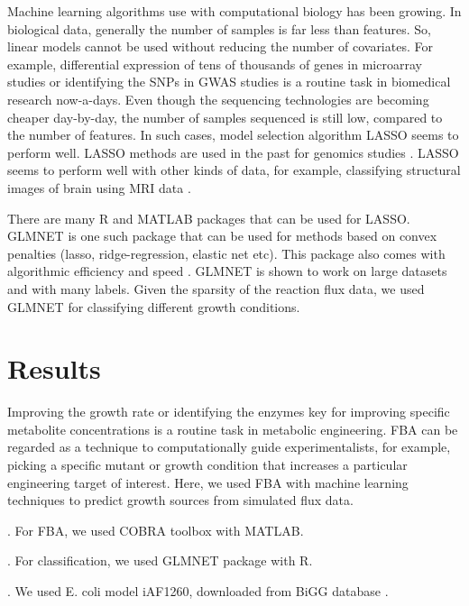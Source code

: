 \documentclass[12pt]{article}
\begin{document}
\bigskip
\noindent
Machine learning algorithms use with computational biology has been growing. In biological data, generally the number of samples is far less than features. So, linear models cannot be used without reducing the number of covariates.  For example, differential expression of tens of thousands of genes in microarray studies or identifying the SNPs in GWAS studies is a routine task in biomedical research now-a-days. Even though the sequencing technologies are becoming cheaper day-by-day, the number of samples sequenced is still low, compared to the number of features. In such cases, model selection algorithm LASSO \cite{Tibshirani1996} seems to perform well. LASSO methods are used in the past for genomics studies \cite{Wuetal2009}. LASSO seems to perform well with other kinds of data, for example, classifying structural images of brain using MRI data \cite{Casanovaetal2011,Casanovaetal2012,Wangetal2012}.

\bigskip
\noindent
There are many R and MATLAB packages that can be used for LASSO. GLMNET  \cite{Friedmanetal2010} is one such package that can be used for methods based on convex penalties (lasso, ridge-regression, elastic net etc). This package also comes with algorithmic efficiency and speed \cite{Friedmanetal2010}. GLMNET is shown to work on large datasets and with many labels. Given the sparsity of the reaction flux data, we used GLMNET \cite{Friedmanetal2010} for classifying different growth conditions.

\section*{Results}

Improving the growth rate or identifying the enzymes key for improving specific metabolite concentrations is a routine task in metabolic engineering. FBA can be regarded as a technique to computationally guide experimentalists, for example, picking a specific mutant or growth condition that increases a particular engineering target of interest. Here, we used FBA with machine learning techniques to predict growth sources from simulated flux data.

\bigskip
{}. For FBA, we used COBRA toolbox \cite{Schellenbergeretal2011} with MATLAB.

\bigskip
{}. For classification, we used GLMNET \cite{Friedmanetal2010} package with R.

\bigskip
{}. We used E. coli model iAF1260, downloaded from BiGG database \cite{Schellenbergeretal2010}.
\end{document}
